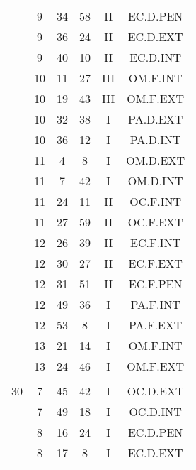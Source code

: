 \documentclass[12pt, a4paper]{article}
\begin{document}
\begin{multicols}{3}
{\begin{tabular}{c c c c c c}
	 	 	 	 & 9 & 34 & 58 & II & EC.D.PEN\\%
	 	 	 	 & 9 & 36 & 24 & II & EC.D.EXT\\%
	 	 	 	 & 9 & 40 & 10 & II & EC.D.INT\\%
	 	 	 	 & 10 & 11 & 27 & III & OM.F.INT\\%
	 	 	 	 & 10 & 19 & 43 & III & OM.F.EXT\\%
	 	 	 	 & 10 & 32 & 38 & I & PA.D.EXT\\%
	 	 	 	 & 10 & 36 & 12 & I & PA.D.INT\\%
	 	 	 	 & 11 & 4 & 8 & I & OM.D.EXT\\%
	 	 	 	 & 11 & 7 & 42 & I & OM.D.INT\\%
	 	 	 	 & 11 & 24 & 11 & II & OC.F.INT\\%
	 	 	 	 & 11 & 27 & 59 & II & OC.F.EXT\\%
	 	 	 	 & 12 & 26 & 39 & II & EC.F.INT\\%
	 	 	 	 & 12 & 30 & 27 & II & EC.F.EXT\\%
	 	 	 	 & 12 & 31 & 51 & II & EC.F.PEN\\%
	 	 	 	 & 12 & 49 & 36 & I & PA.F.INT\\%
	 	 	 	 & 12 & 53 & 8 & I & PA.F.EXT\\%
	 	 	 	 & 13 & 21 & 14 & I & OM.F.INT\\%
	 	 	 	 & 13 & 24 & 46 & I & OM.F.EXT\\%
	 	 	 	 & & & & & \\%
	 	 	 	30 & 7 & 45 & 42 & I & OC.D.EXT\\%
	 	 	 	 & 7 & 49 & 18 & I & OC.D.INT\\%
	 	 	 	 & 8 & 16 & 24 & I & EC.D.PEN\\%
	 	 	 	 & 8 & 17 & 8 & I & EC.D.EXT\\%

\end{tabular}}
\end{multicols}
\end{document}
